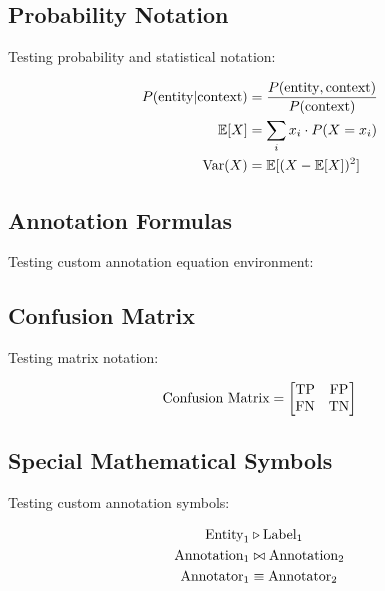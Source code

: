 \documentclass[11pt,a4paper]{article}
\begin{document}
\subsection{Probability Notation}
Testing probability and statistical notation:

\begin{align}
P(\text{entity}|\text{context}) &= \frac{P(\text{entity}, \text{context})}{P(\text{context})} \\
\mathbb{E}[X] &= \sum_{i} x_i \cdot P(X = x_i) \\
\text{Var}(X) &= \mathbb{E}[(X - \mathbb{E}[X])^2]
\end{align}

\subsection{Annotation Formulas}
Testing custom annotation equation environment:


\subsection{Confusion Matrix}
Testing matrix notation:

\[
\text{Confusion Matrix} = \begin{bmatrix} \text{TP} & \text{FP} \\ \text{FN} & \text{TN} \end{bmatrix}
\]

\subsection{Special Mathematical Symbols}
Testing custom annotation symbols:

\begin{align}
\text{Entity}_1 &\triangleright \text{Label}_1 \\
\text{Annotation}_1 &\bowtie \text{Annotation}_2 \\
\text{Annotator}_1 &\equiv \text{Annotator}_2
\end{align}
\end{document}
